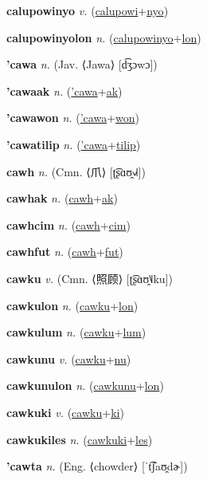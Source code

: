\textbf{\hypertarget{calupowinyo}{calupowinyo}} \textit{v.} (\hyperlink{calupowi}{calupowi}+\allowbreak \hyperlink{nyo}{nyo})


\textbf{\hypertarget{calupowinyolon}{calupowinyolon}} \textit{n.} (\hyperlink{calupowinyo}{calupowinyo}+\allowbreak \hyperlink{lon}{lon})


\textbf{\hypertarget{'cawa}{'cawa}} \textit{n.} (Jav. ⟨Jawa⟩ [d͡ʒɔwɔ])


\textbf{\hypertarget{'cawaak}{'cawaak}} \textit{n.} (\hyperlink{'cawa}{'cawa}+\allowbreak \hyperlink{ak}{ak})


\textbf{\hypertarget{'cawawon}{'cawawon}} \textit{n.} (\hyperlink{'cawa}{'cawa}+\allowbreak \hyperlink{won}{won})


\textbf{\hypertarget{'cawatilip}{'cawatilip}} \textit{n.} (\hyperlink{'cawa}{'cawa}+\allowbreak \hyperlink{tilip}{tilip})


\textbf{\hypertarget{cawh}{cawh}} \textit{n.} (Cmn. ⟨{\chinese{}爪}⟩ [ʈ͡ʂɑʊ̯˧˩˧])


\textbf{\hypertarget{cawhak}{cawhak}} \textit{n.} (\hyperlink{cawh}{cawh}+\allowbreak \hyperlink{ak}{ak})


\textbf{\hypertarget{cawhcim}{cawhcim}} \textit{n.} (\hyperlink{cawh}{cawh}+\allowbreak \hyperlink{cim}{cim})


\textbf{\hypertarget{cawhfut}{cawhfut}} \textit{n.} (\hyperlink{cawh}{cawh}+\allowbreak \hyperlink{fut}{fut})


\textbf{\hypertarget{cawku}{cawku}} \textit{v.} (Cmn. ⟨{\chinese{}照顾}⟩ [ʈ͡ʂɑʊ̯˥˩ku])


\textbf{\hypertarget{cawkulon}{cawkulon}} \textit{n.} (\hyperlink{cawku}{cawku}+\allowbreak \hyperlink{lon}{lon})


\textbf{\hypertarget{cawkulum}{cawkulum}} \textit{n.} (\hyperlink{cawku}{cawku}+\allowbreak \hyperlink{lum}{lum})


\textbf{\hypertarget{cawkunu}{cawkunu}} \textit{v.} (\hyperlink{cawku}{cawku}+\allowbreak \hyperlink{nu}{nu})


\textbf{\hypertarget{cawkunulon}{cawkunulon}} \textit{n.} (\hyperlink{cawkunu}{cawkunu}+\allowbreak \hyperlink{lon}{lon})


\textbf{\hypertarget{cawkuki}{cawkuki}} \textit{v.} (\hyperlink{cawku}{cawku}+\allowbreak \hyperlink{ki}{ki})


\textbf{\hypertarget{cawkukiles}{cawkukiles}} \textit{n.} (\hyperlink{cawkuki}{cawkuki}+\allowbreak \hyperlink{les}{les})


\textbf{\hypertarget{'cawta}{'cawta}} \textit{n.} (Eng. ⟨chowder⟩ [ˈt͡ʃaʊ̯dɚ])


